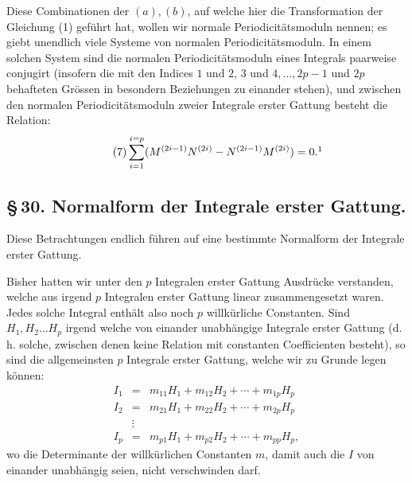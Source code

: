 \documentclass[10pt]{article}
\begin{document}
Diese Combinationen der \((a),(b)\), auf welche hier die Transformation der Gleichung (1) geführt hat, wollen wir normale Periodicitätsmoduln nennen; es giebt unendlich viele Systeme von normalen Periodicitätsmoduln. In einem solchen System sind die normalen Periodicitätsmoduln eines Integrals paarweise conjugirt (insofern die mit den Indices \(1\) und \(2\), \(3\) und \(4,\ldots,2p-1\) und \(2p\) behafteten Grössen in besondern Beziehungen zu einander stehen), und zwischen den normalen Periodicitätsmoduln zweier Integrale erster Gattung besteht die Relation:
\[
\tag{7}\sum_{i=1}^{i=p}(M^{(2i-1)}N^{(2i)}-N^{(2i-1)}M^{(2i)})=0.\footnotemark
\]

\subsection*{\S\,30. Normalform der Integrale erster Gattung.}

Diese Betrachtungen endlich führen auf eine bestimmte Normalform der Integrale erster Gattung.

Bisher hatten wir unter den \(p\) Integralen erster Gattung Ausdrücke verstanden, welche aus irgend \(p\) Integralen erster Gattung linear zusammengesetzt waren. Jedes solche Integral enthält also noch \(p\) willkürliche Constanten. Sind \(H_1,H_2\ldots H_p\) irgend welche von einander unabhängige Integrale erster Gattung (d. h. solche, zwischen denen keine Relation mit constanten Coefficienten besteht), so sind die allgemeinsten \(p\) Integrale erster Gattung, welche wir zu Grunde legen können:
\[
\begin{array}{rcl}
I_1&=&m_{11}H_1+m_{12}H_2+\cdots+m_{1p}H_p\\
I_2&=&m_{21}H_1+m_{22}H_2+\cdots+m_{2p}H_p\\
&\vdots&\\
I_p&=&m_{p1}H_1+m_{p2}H_2+\cdots+m_{pp}H_p,
\end{array}
\]
wo die Determinante der willkürlichen Constanten \(m\), damit auch die \(I\) von einander unabhängig seien, nicht verschwinden darf.
\end{document}

